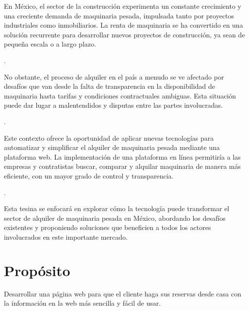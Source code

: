 \documentclass{article}
\begin{document}
En México, el sector de la construcción experimenta un constante crecimiento y una creciente demanda de maquinaria pesada, impulsada tanto por proyectos industriales como inmobiliarios. La renta de maquinaria se ha convertido en una solución recurrente para desarrollar nuevos proyectos de construcción, ya sean de pequeña escala o a largo plazo.\par. 

No obstante, el proceso de alquiler en el país a menudo se ve afectado por desafíos que van desde la falta de transparencia en la disponibilidad de maquinaria hasta tarifas y condiciones contractuales ambiguas. Esta situación puede dar lugar a malentendidos y disputas entre las partes involucradas.\par.

Este contexto ofrece la oportunidad de aplicar nuevas tecnologías para automatizar y simplificar el alquiler de maquinaria pesada mediante una plataforma web. La implementación de una plataforma en línea permitiría a las empresas y contratistas buscar, comparar y alquilar maquinaria de manera más eficiente, con un mayor grado de control y transparencia.\par.

Esta tesina se enfocará en explorar cómo la tecnología puede transformar el sector de alquiler de maquinaria pesada en México, abordando los desafíos existentes y proponiendo soluciones que beneficien a todos los actores involucrados en este importante mercado.\par

\section{Propósito}

Desarrollar una página web para que el cliente haga sus reservas desde casa con la información en la web más sencilla y fácil de usar.
\end{document}
